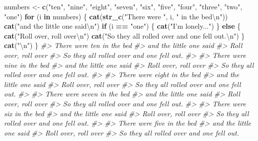 \documentclass[]{book}
\newenvironment{Shaded}{\begin{snugshade}}{\end{snugshade}}
\newcommand{\CharTok}[1]{\textcolor[rgb]{0.31,0.60,0.02}{#1}}
\newcommand{\CommentTok}[1]{\textcolor[rgb]{0.56,0.35,0.01}{\textit{#1}}}
\newcommand{\ControlFlowTok}[1]{\textcolor[rgb]{0.13,0.29,0.53}{\textbf{#1}}}
\newcommand{\KeywordTok}[1]{\textcolor[rgb]{0.13,0.29,0.53}{\textbf{#1}}}
\newcommand{\NormalTok}[1]{#1}
\newcommand{\OperatorTok}[1]{\textcolor[rgb]{0.81,0.36,0.00}{\textbf{#1}}}
\newcommand{\StringTok}[1]{\textcolor[rgb]{0.31,0.60,0.02}{#1}}
\theoremstyle{plain}
\theoremstyle{remark}
\begin{document}
\begin{enumerate}
\begin{Shaded}
\begin{Highlighting}[]
\NormalTok{numbers <-}\StringTok{ }\KeywordTok{c}\NormalTok{(}\StringTok{"ten"}\NormalTok{, }\StringTok{"nine"}\NormalTok{, }\StringTok{"eight"}\NormalTok{, }\StringTok{"seven"}\NormalTok{, }\StringTok{"six"}\NormalTok{, }\StringTok{"five"}\NormalTok{,}
             \StringTok{"four"}\NormalTok{, }\StringTok{"three"}\NormalTok{, }\StringTok{"two"}\NormalTok{, }\StringTok{"one"}\NormalTok{)}
\ControlFlowTok{for}\NormalTok{ (i }\ControlFlowTok{in}\NormalTok{ numbers) \{}
  \KeywordTok{cat}\NormalTok{(}\KeywordTok{str_c}\NormalTok{(}\StringTok{"There were "}\NormalTok{, i, }\StringTok{" in the bed}\CharTok{\textbackslash{}n}\StringTok{"}\NormalTok{))}
  \KeywordTok{cat}\NormalTok{(}\StringTok{"and the little one said}\CharTok{\textbackslash{}n}\StringTok{"}\NormalTok{)}
  \ControlFlowTok{if}\NormalTok{ (i }\OperatorTok{==}\StringTok{ "one"}\NormalTok{) \{}
    \KeywordTok{cat}\NormalTok{(}\StringTok{"I'm lonely..."}\NormalTok{)}
\NormalTok{  \} }\ControlFlowTok{else}\NormalTok{ \{}
    \KeywordTok{cat}\NormalTok{(}\StringTok{"Roll over, roll over}\CharTok{\textbackslash{}n}\StringTok{"}\NormalTok{)}
    \KeywordTok{cat}\NormalTok{(}\StringTok{"So they all rolled over and one fell out.}\CharTok{\textbackslash{}n}\StringTok{"}\NormalTok{)}
\NormalTok{  \}}
  \KeywordTok{cat}\NormalTok{(}\StringTok{"}\CharTok{\textbackslash{}n}\StringTok{"}\NormalTok{)}
\NormalTok{\}}
\CommentTok{#> There were ten in the bed}
\CommentTok{#> and the little one said}
\CommentTok{#> Roll over, roll over}
\CommentTok{#> So they all rolled over and one fell out.}
\CommentTok{#> }
\CommentTok{#> There were nine in the bed}
\CommentTok{#> and the little one said}
\CommentTok{#> Roll over, roll over}
\CommentTok{#> So they all rolled over and one fell out.}
\CommentTok{#> }
\CommentTok{#> There were eight in the bed}
\CommentTok{#> and the little one said}
\CommentTok{#> Roll over, roll over}
\CommentTok{#> So they all rolled over and one fell out.}
\CommentTok{#> }
\CommentTok{#> There were seven in the bed}
\CommentTok{#> and the little one said}
\CommentTok{#> Roll over, roll over}
\CommentTok{#> So they all rolled over and one fell out.}
\CommentTok{#> }
\CommentTok{#> There were six in the bed}
\CommentTok{#> and the little one said}
\CommentTok{#> Roll over, roll over}
\CommentTok{#> So they all rolled over and one fell out.}
\CommentTok{#> }
\CommentTok{#> There were five in the bed}
\CommentTok{#> and the little one said}
\CommentTok{#> Roll over, roll over}
\CommentTok{#> So they all rolled over and one fell out.}

\end{Highlighting}
\end{Shaded}
\end{enumerate}
\end{document}
